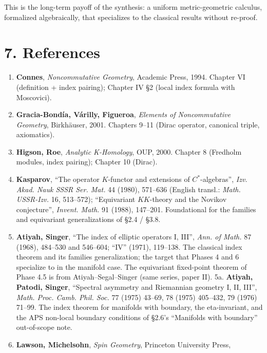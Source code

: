 \documentclass[
  11pt,
]{article}
\providecommand{\tightlist}{%
  \setlength{\itemsep}{0pt}\setlength{\parskip}{0pt}}
\begin{document}
This is the long-term payoff of the synthesis: a uniform
metric-geometric calculus, formalized algebraically, that specializes to
the classical results without re-proof.

\section{7. References}\label{references}

\begin{enumerate}
\def\labelenumi{\arabic{enumi}.}
\tightlist
\item
  \textbf{Connes}, \emph{Noncommutative Geometry}, Academic Press, 1994.
  Chapter VI (definition + index pairing); Chapter IV §2 (local index
  formula with Moscovici).
\item
  \textbf{Gracia-Bondía, Várilly, Figueroa}, \emph{Elements of
  Noncommutative Geometry}, Birkhäuser, 2001. Chapters 9--11 (Dirac
  operator, canonical triple, axiomatics).
\item
  \textbf{Higson, Roe}, \emph{Analytic K-Homology}, OUP, 2000. Chapter 8
  (Fredholm modules, index pairing); Chapter 10 (Dirac).
\item
  \textbf{Kasparov}, ``The operator \(K\)-functor and extensions of
  \(C^*\)-algebras'', \emph{Izv. Akad. Nauk SSSR Ser. Mat.} 44 (1980),
  571--636 (English transl.: \emph{Math. USSR-Izv.} 16, 513--572);
  ``Equivariant \(KK\)-theory and the Novikov conjecture'',
  \emph{Invent. Math.} 91 (1988), 147--201. Foundational for the
  families and equivariant generalizations of §2.4 / §3.8.
\item
  \textbf{Atiyah, Singer}, ``The index of elliptic operators I, III'',
  \emph{Ann. of Math.} 87 (1968), 484--530 and 546--604; ``IV'' (1971),
  119--138. The classical index theorem and its families generalization;
  the target that Phases 4 and 6 specialize to in the manifold case. The
  equivariant fixed-point theorem of Phase 4.5 is from
  Atiyah--Segal--Singer (same series, paper II). 5a. \textbf{Atiyah,
  Patodi, Singer}, ``Spectral asymmetry and Riemannian geometry I, II,
  III'', \emph{Math. Proc. Camb. Phil. Soc.} 77 (1975) 43--69, 78 (1975)
  405--432, 79 (1976) 71--99. The index theorem for manifolds with
  boundary, the eta-invariant, and the APS non-local boundary conditions
  of §2.6's ``Manifolds with boundary'' out-of-scope note.
\item
  \textbf{Lawson, Michelsohn}, \emph{Spin Geometry}, Princeton
  University Press,


\end{enumerate}
\end{document}
